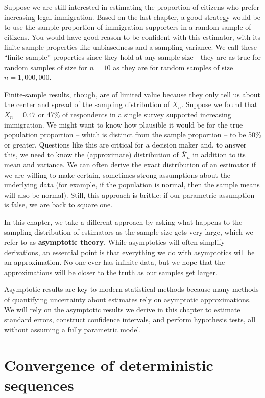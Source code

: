 \documentclass[
  13pt,
  letterpaper,
  DIV=11,
  numbers=noendperiod]{scrreprt}
\newcommand{\Xbar}{\overline{X}}
\theoremstyle{definition}
\theoremstyle{definition}
\theoremstyle{plain}
\theoremstyle{remark}
\begin{document}
Suppose we are still interested in estimating the proportion of citizens
who prefer increasing legal immigration. Based on the last chapter, a
good strategy would be to use the sample proportion of immigration
supporters in a random sample of citizens. You would have good reason to
be confident with this estimator, with its finite-sample properties like
unbiasedness and a sampling variance. We call these ``finite-sample''
properties since they hold at any sample size---they are as true for
random samples of size for \(n = 10\) as they are for random samples of
size \(n = 1,000,000\).

Finite-sample results, though, are of limited value because they only
tell us about the center and spread of the sampling distribution of
\(\Xbar_n\). Suppose we found that \(\Xbar_n = 0.47\) or 47\% of
respondents in a single survey supported increasing immigration. We
might want to know how plausible it would be for the true population
proportion -- which is distinct from the sample proportion -- to be 50\%
or greater. Questions like this are critical for a decision maker and,
to answer this, we need to know the (approximate) distribution of
\(\Xbar_n\) in addition to its mean and variance. We can often derive
the exact distribution of an estimator if we are willing to make
certain, sometimes strong assumptions about the underlying data (for
example, if the population is normal, then the sample means will also be
normal). Still, this approach is brittle: if our parametric assumption
is false, we are back to square one.

In this chapter, we take a different approach by asking what happens to
the sampling distribution of estimators as the sample size gets very
large, which we refer to as \textbf{asymptotic theory}. While
asymptotics will often simplify derivations, an essential point is that
everything we do with asymptotics will be an approximation. No one ever
has infinite data, but we hope that the approximations will be closer to
the truth as our samples get larger.

Asymptotic results are key to modern statistical methods because many
methods of quantifying uncertainty about estimates rely on asymptotic
approximations. We will rely on the asymptotic results we derive in this
chapter to estimate standard errors, construct confidence intervals, and
perform hypothesis tests, all without assuming a fully parametric model.

\section{Convergence of deterministic
sequences}\label{convergence-of-deterministic-sequences}
\end{document}
